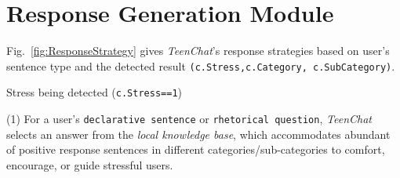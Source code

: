 \section{Response Generation Module}

Fig.~\ref{fig:ResponseStrategy} gives \emph{TeenChat}'s response strategies
based on  user's sentence type and the detected result \texttt{(c.Stress,c.Category, c.SubCategory)}.

 Stress being detected (\texttt{c.Stress==1})

\noindent (1) For a user's \texttt{declarative sentence} or \texttt{rhetorical question}, \emph{TeenChat} selects an answer from the \emph{local knowledge base}, which accommodates abundant of positive response sentences in different categories/sub-categories to comfort, encourage, or guide stressful users.

